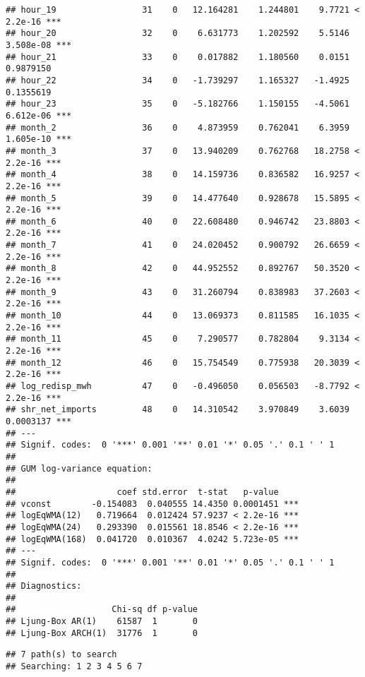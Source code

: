 \documentclass[
]{article}
\begin{document}
\begin{verbatim}
## hour_19                 31    0   12.164281    1.244801    9.7721 < 2.2e-16 ***
## hour_20                 32    0    6.631773    1.202592    5.5146 3.508e-08 ***
## hour_21                 33    0    0.017882    1.180560    0.0151 0.9879150    
## hour_22                 34    0   -1.739297    1.165327   -1.4925 0.1355619    
## hour_23                 35    0   -5.182766    1.150155   -4.5061 6.612e-06 ***
## month_2                 36    0    4.873959    0.762041    6.3959 1.605e-10 ***
## month_3                 37    0   13.940209    0.762768   18.2758 < 2.2e-16 ***
## month_4                 38    0   14.159736    0.836582   16.9257 < 2.2e-16 ***
## month_5                 39    0   14.477640    0.928678   15.5895 < 2.2e-16 ***
## month_6                 40    0   22.608480    0.946742   23.8803 < 2.2e-16 ***
## month_7                 41    0   24.020452    0.900792   26.6659 < 2.2e-16 ***
## month_8                 42    0   44.952552    0.892767   50.3520 < 2.2e-16 ***
## month_9                 43    0   31.260794    0.838983   37.2603 < 2.2e-16 ***
## month_10                44    0   13.069373    0.811585   16.1035 < 2.2e-16 ***
## month_11                45    0    7.290577    0.782804    9.3134 < 2.2e-16 ***
## month_12                46    0   15.754549    0.775938   20.3039 < 2.2e-16 ***
## log_redisp_mwh          47    0   -0.496050    0.056503   -8.7792 < 2.2e-16 ***
## shr_net_imports         48    0   14.310542    3.970849    3.6039 0.0003137 ***
## ---
## Signif. codes:  0 '***' 0.001 '**' 0.01 '*' 0.05 '.' 0.1 ' ' 1
## 
## GUM log-variance equation:
## 
##                    coef std.error  t-stat   p-value    
## vconst        -0.154083  0.040555 14.4350 0.0001451 ***
## logEqWMA(12)   0.719664  0.012424 57.9237 < 2.2e-16 ***
## logEqWMA(24)   0.293390  0.015561 18.8546 < 2.2e-16 ***
## logEqWMA(168)  0.041720  0.010367  4.0242 5.723e-05 ***
## ---
## Signif. codes:  0 '***' 0.001 '**' 0.01 '*' 0.05 '.' 0.1 ' ' 1
## 
## Diagnostics:
## 
##                   Chi-sq df p-value
## Ljung-Box AR(1)    61587  1       0
## Ljung-Box ARCH(1)  31776  1       0
\end{verbatim}

\begin{verbatim}
## 7 path(s) to search
## Searching: 1 2 3 4 5 6 7
\end{verbatim}
\end{document}
